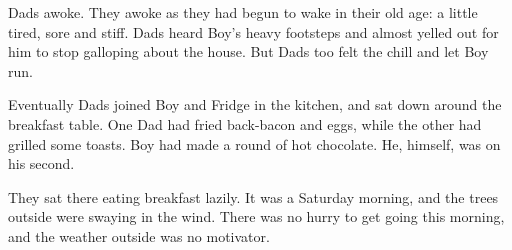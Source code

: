 \documentclass[fontsize=12pt,english]{scrreprt}
\begin{document}
Dads awoke. They awoke as they had begun to wake in their old age: a
little tired, sore and stiff. Dads heard Boy's heavy footsteps and
almost yelled out for him to stop galloping about the house. But Dads
too felt the chill and let Boy run.

Eventually Dads joined Boy and Fridge in the kitchen, and sat down
around the breakfast table. One Dad had fried back-bacon and eggs,
while the other had grilled some toasts. Boy had made a round of hot
chocolate. He, himself, was on his second.

They sat there eating breakfast lazily. It was a Saturday morning, and
the trees outside were swaying in the wind. There was no hurry to get
going this morning, and the weather outside was no motivator.
\end{document}
